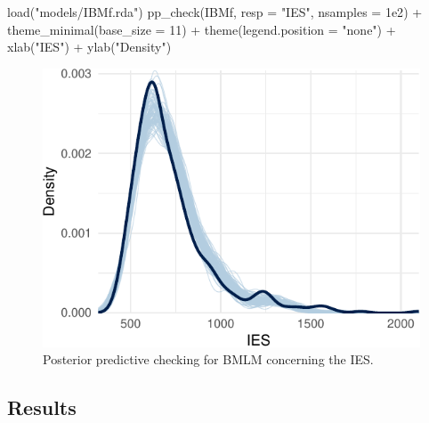 \documentclass[
  11pt,
  english,
  ,doc,floatsintext]{apa6}
\newenvironment{Shaded}{}{}
\newcommand{\AttributeTok}[1]{\textcolor[rgb]{0.49,0.56,0.16}{#1}}
\newcommand{\DecValTok}[1]{\textcolor[rgb]{0.25,0.63,0.44}{#1}}
\newcommand{\FloatTok}[1]{\textcolor[rgb]{0.25,0.63,0.44}{#1}}
\newcommand{\FunctionTok}[1]{\textcolor[rgb]{0.02,0.16,0.49}{#1}}
\newcommand{\NormalTok}[1]{#1}
\newcommand{\SpecialCharTok}[1]{\textcolor[rgb]{0.25,0.44,0.63}{#1}}
\newcommand{\StringTok}[1]{\textcolor[rgb]{0.25,0.44,0.63}{#1}}
\begin{document}
\begin{Shaded}
\begin{Highlighting}[]
\FunctionTok{load}\NormalTok{(}\StringTok{"models/IBMf.rda"}\NormalTok{)}
\FunctionTok{pp\_check}\NormalTok{(IBMf, }\AttributeTok{resp =} \StringTok{"IES"}\NormalTok{, }\AttributeTok{nsamples =} \FloatTok{1e2}\NormalTok{) }\SpecialCharTok{+}
  \FunctionTok{theme\_minimal}\NormalTok{(}\AttributeTok{base\_size =} \DecValTok{11}\NormalTok{) }\SpecialCharTok{+}
  \FunctionTok{theme}\NormalTok{(}\AttributeTok{legend.position =} \StringTok{"none"}\NormalTok{) }\SpecialCharTok{+}
  \FunctionTok{xlab}\NormalTok{(}\StringTok{"IES"}\NormalTok{) }\SpecialCharTok{+}
  \FunctionTok{ylab}\NormalTok{(}\StringTok{"Density"}\NormalTok{)}
\end{Highlighting}
\end{Shaded}

\begin{figure}[!h]

{\centering \includegraphics[width=\textwidth]{supplementary_materials_files/figure-latex/ppcheckIBMf-1} 

}

\caption{Posterior predictive checking for BMLM concerning the IES.}\label{fig:ppcheckIBMf}
\end{figure}

\hypertarget{results-1}{%
\subsection{Results}\label{results-1}}
\end{document}
